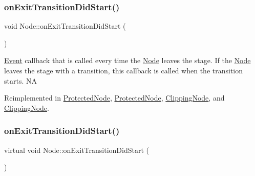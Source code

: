 \mbox{\label{classNode_a11686054c0d2edd292a53aa9702aaece}} 
\subsubsection{\texorpdfstring{on\+Exit\+Transition\+Did\+Start()}{onExitTransitionDidStart()}\hspace{0.1cm}{\footnotesize\ttfamily [1/2]}}
{\footnotesize\ttfamily void Node\+::on\+Exit\+Transition\+Did\+Start (\begin{DoxyParamCaption}{ }\end{DoxyParamCaption})\hspace{0.3cm}{\ttfamily [virtual]}}

\hyperlink{classEvent}{Event} callback that is called every time the \hyperlink{classNode}{Node} leaves the \textquotesingle{}stage\textquotesingle{}. If the \hyperlink{classNode}{Node} leaves the \textquotesingle{}stage\textquotesingle{} with a transition, this callback is called when the transition starts.  NA 

Reimplemented in \hyperlink{classProtectedNode_a3efa91524a31d8f0919be2db8af1ddc9}{Protected\+Node}, \hyperlink{classProtectedNode_a3f4bf0c9b9ec81b486f479d30fc1ed67}{Protected\+Node}, \hyperlink{classClippingNode_a4637553a7b0ae136a1e9cb1684b3db57}{Clipping\+Node}, and \hyperlink{classClippingNode_ab45e60bbd0afe536e806f05a963dd512}{Clipping\+Node}.

\mbox{\label{classNode_a14c2a4fe52123f1e928041a961eb679d}} 
\subsubsection{\texorpdfstring{on\+Exit\+Transition\+Did\+Start()}{onExitTransitionDidStart()}\hspace{0.1cm}{\footnotesize\ttfamily [2/2]}}
{\footnotesize\ttfamily virtual void Node\+::on\+Exit\+Transition\+Did\+Start (\begin{DoxyParamCaption}{ }\end{DoxyParamCaption})\hspace{0.3cm}{\ttfamily [virtual]}}

